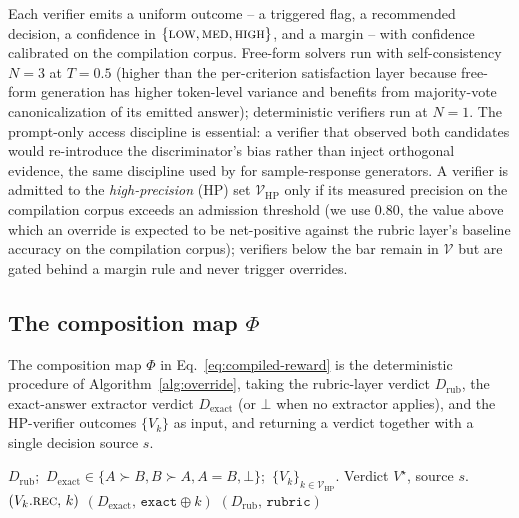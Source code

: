 Each verifier emits a uniform outcome -- a triggered flag, a
recommended decision, a confidence in
$\{\textsc{low},\textsc{med},\textsc{high}\}$, and a margin -- with
confidence calibrated on the compilation corpus.  Free-form solvers
run with self-consistency $N{=}3$ at $T{=}0.5$ (higher than the
per-criterion satisfaction layer because free-form generation has
higher token-level variance and benefits from majority-vote
canonicalization of its emitted answer); deterministic verifiers run
at $N{=}1$.  The prompt-only access discipline is essential: a
verifier that observed both candidates would re-introduce the
discriminator's bias rather than inject orthogonal evidence, the
same discipline used by \citet{shen2026rrd} for sample-response
generators.  A verifier is admitted to the \emph{high-precision}
(HP) set $\mathcal{V}_{\text{HP}}$ only if its measured precision on
the compilation corpus exceeds an admission threshold (we use
$0.80$, the value above which an override is expected to be
net-positive against the rubric layer's baseline accuracy on the
compilation corpus); verifiers below the bar remain in $\mathcal{V}$
but are gated behind a margin rule and never trigger overrides.

\subsection{The composition map $\Phi$}
\label{sec:phi}

The composition map $\Phi$ in Eq.~\eqref{eq:compiled-reward} is the
deterministic procedure of Algorithm~\ref{alg:override}, taking the
rubric-layer verdict $D_{\text{rub}}$, the exact-answer extractor
verdict $D_{\text{exact}}$ (or $\bot$ when no extractor applies), and
the HP-verifier outcomes $\{V_k\}$ as input, and returning a verdict
together with a single decision source $s$.

\begin{algorithm}[t]
\caption{Agreement-aware composition map $\Phi$}
\label{alg:override}
\begin{algorithmic}[1]
\Require $D_{\text{rub}}$;\, $D_{\text{exact}} \in \{A{\succ}B,B{\succ}A,A{=}B,\bot\}$;\,
         $\{V_k\}_{k\in\mathcal{V}_{\text{HP}}}$.
\Ensure  Verdict $V^{\star}$, source $s$.
    \State \Return $(V_k.\textsc{rec},\, k)$ 
  \EndIf
\EndFor
{}
      \State \Return $(D_{\text{exact}},\, \texttt{exact}{\oplus}k)$
    \EndIf
  \EndFor
\EndIf
\State \Return $(D_{\text{rub}},\, \texttt{rubric})$ 
\end{algorithmic}
\end{algorithm}

